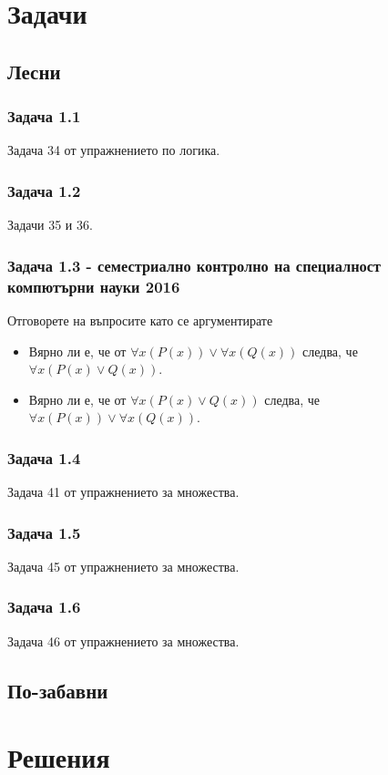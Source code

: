 \documentclass[12pt]{article}
\begin{document}
\section*{Задачи}

\subsection*{Лесни}
\subsubsection*{Задача 1.1}
Задача 34 от упражнението по логика.
\subsubsection*{Задача 1.2}
Задачи 35 и 36.
\subsubsection*{Задача 1.3 - семестриално контролно на специалност компютърни науки 2016}
Отговорете на въпросите като се аргументирате
\begin{itemize}
    \item Вярно ли е, че от $\forall x (P(x)) \lor \forall x(Q(x))$ следва, че $\forall x (P(x) \lor Q(x))$.
    \item Вярно ли е, че от $\forall x (P(x) \lor Q(x))$ следва, че $\forall x (P(x)) \lor \forall x(Q(x))$.
\end{itemize}
\subsubsection*{Задача 1.4}
Задача 41 от упражнението за множества.
\subsubsection*{Задача 1.5}
Задача 45 от упражнението за множества.
\subsubsection*{Задача 1.6}
Задача 46 от упражнението за множества.

\subsection*{По-забавни}

\section*{Решения}
\end{document}
